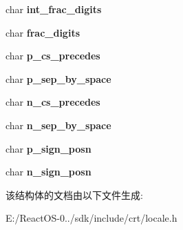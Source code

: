 \begin{DoxyCompactItemize}
\item 
\mbox{\label{structlconv_a6b652f28cafc3092258b47c8099fe905}} 
char {\bfseries int\+\_\+frac\+\_\+digits}
\item 
\mbox{\label{structlconv_aa16e32ff4dcc95445742b5b165ffb071}} 
char {\bfseries frac\+\_\+digits}
\item 
\mbox{\label{structlconv_af0651922c77fc926609bdd8746784e63}} 
char {\bfseries p\+\_\+cs\+\_\+precedes}
\item 
\mbox{\label{structlconv_a3ae3cb36f4426158e4ab2ea6dc4278ad}} 
char {\bfseries p\+\_\+sep\+\_\+by\+\_\+space}
\item 
\mbox{\label{structlconv_ad118b68a229527f7e96538ac875169ad}} 
char {\bfseries n\+\_\+cs\+\_\+precedes}
\item 
\mbox{\label{structlconv_ab7ac20ce034900155183b32fc3c6d9a3}} 
char {\bfseries n\+\_\+sep\+\_\+by\+\_\+space}
\item 
\mbox{\label{structlconv_a1fdead36abe5c2ca673142ea401478e8}} 
char {\bfseries p\+\_\+sign\+\_\+posn}
\item 
\mbox{\label{structlconv_ae0bbe6f545952daef5a8cbdd054a184e}} 
char {\bfseries n\+\_\+sign\+\_\+posn}
\end{DoxyCompactItemize}


该结构体的文档由以下文件生成\+:\begin{DoxyCompactItemize}
\item 
E\+:/\+React\+O\+S-\/0../sdk/include/crt/locale.\+h\end{DoxyCompactItemize}
